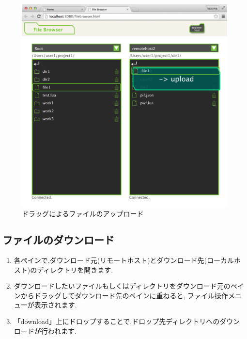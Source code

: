 \documentclass[a4paper,10pt,oneside]{jsbook}
\begin{document}
\begin{figure}[htbp]
	\begin{center}
		\includegraphics[width=12.0cm]{image/filebrowser_009.png}
	\end{center}
	\caption{ドラッグによるファイルのアップロード}
	\label{fig:filebrowser_fileupload}
\end{figure}

\newpage

\subsection{ファイルのダウンロード}
\begin{enumerate}
	\item 各ペインで,ダウンロード元(リモートホスト)とダウンロード先(ローカルホスト)のディレクトリを開きます.
	\item ダウンロードしたいファイルもしくはディレクトリをダウンロード元のペインからドラッグしてダウンロード先のペインに重ねると,
		  ファイル操作メニューが表示されます.
	\item 「download」上にドロップすることで,ドロップ先ディレクトリへのダウンロードが行われます.
\end{enumerate}
\end{document}
